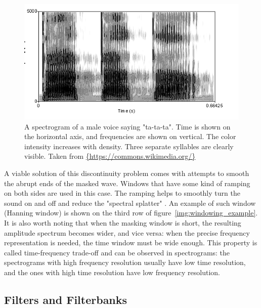 \begin{figure}[t]
	\centering
	\includegraphics[height=0.25\textheight]{include/spectrogram_example}
	\caption[An example of a spectrogram]{A spectrogram of a male voice saying "ta-ta-ta". Time is shown on the horizontal axis, and frequencies are shown on vertical. The color intensity increases with density. Three separate syllables are clearly visible. Taken from \url{{https://commons.wikimedia.org/}}}
	\label{img:spectrogram_example}
\end{figure}

A viable solution of this discontinuity problem comes with attempts to smooth the abrupt ends of the masked wave. Windows that have some kind of ramping on both sides are used in this case. The ramping helps to smoothly turn the sound on and off and reduce the "spectral splatter" \cite{Schnupp2011}. An example of such window (Hanning window) is shown on the third row of fi\-gure~\ref{img:windowing_example}.\\

It is also worth noting that when the masking window is short, the resulting amplitude spectrum becomes wider, and vice versa: when the precise frequency representation is needed, the time window must be wide enough. This property is called time-frequency trade-off and can be observed in spectrograms: the spectrograms with high frequency resolution usually have low time resolution, and the ones with high time resolution have low frequency resolution.

\subsection{Filters and Filterbanks}\label{section:math_filters}

